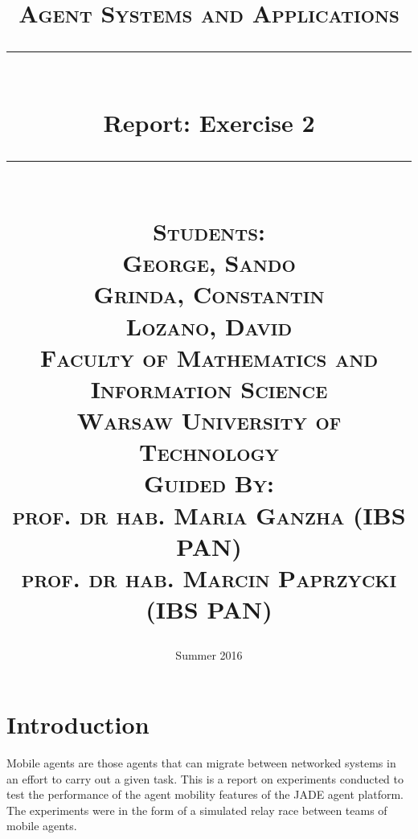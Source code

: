 \documentclass[11pt,titlepage]{article}
\newcommand{\HRule}[1]{\rule{\linewidth}{#1}}
\begin{document}
\title{ \normalsize \textsc{Agent Systems and Applications}
	\\ [2.0cm]
	\HRule{0.5pt} \\
	\selectfont
	\LARGE Report: Exercise 2
	\HRule{2pt} \\ [0.5cm]
	\normalsize \vspace{5\baselineskip}
	\normalfont \flushleft
	\textsc{Students:\\
		George, Sando\\
		Grinda, Constantin\\
		Lozano, David\\
		\vspace{2\baselineskip}
		Faculty of Mathematics and Information Science\\
		Warsaw University of Technology}\\
	\vspace{3\baselineskip}	
	\textsc{Guided By:\\
		prof. dr hab. Maria Ganzha (IBS PAN)\\
		prof. dr hab. Marcin Paprzycki (IBS PAN)}}


\author{}

\date{Summer 2016}
\maketitle




\newpage
	\tableofcontents
	\listoffigures

\newpage
\section{Introduction}

Mobile agents are those agents that can migrate between networked systems in an effort to carry out a given task. This is a report on experiments conducted to test the performance of the agent mobility features of the JADE agent platform. The experiments were in the form of a simulated relay race between teams of mobile agents.
\end{document}
